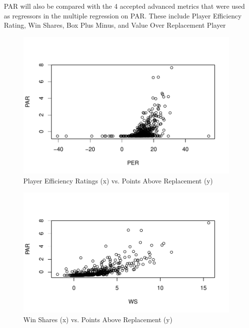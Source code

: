 \documentclass[12pt]{article}
\begin{document}
PAR will also be compared with the 4 accepted advanced metrics that were used as regressors in the 
multiple regression on PAR. These include Player Efficiency Rating, Win Shares, Box Plus Minus, and 
Value Over Replacement Player

\begin{figure}[H]
  \centering
  \includegraphics[scale = 0.6]{PERvsPAR}
  \caption{Player Efficiency Ratings (x) vs. Points Above Replacement (y)}
  \label{fig:Fig1}
\end{figure}

\begin{figure}[H]
  \centering
  \includegraphics[scale = 0.6]{WSvsPAR}
  \caption{Win Shares (x) vs. Points Above Replacement (y)}
  \label{fig:Fig2}
\end{figure}
\end{document}
